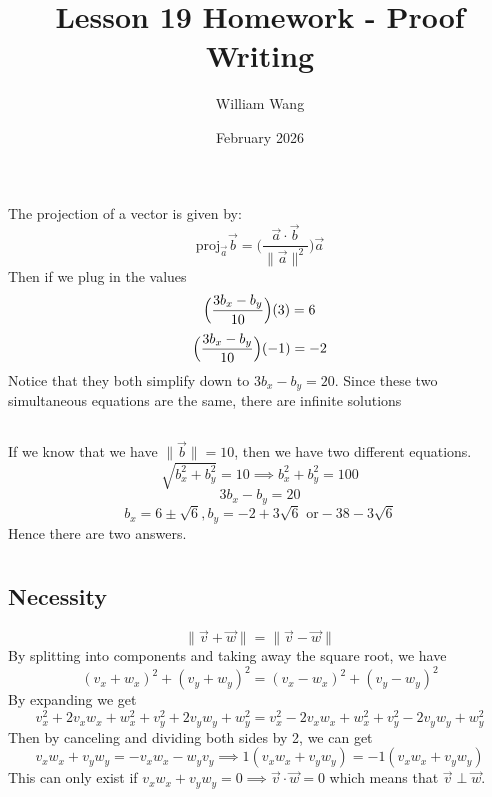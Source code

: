 \documentclass{article}
\title{Lesson 19 Homework - Proof Writing}
\author{William Wang}
\date{February 2026}
\begin{document}
\maketitle

\section{}
\subsection{}
The projection of a vector is given by:
\[\text{proj}_{\vec{a}} \vec{b} = \biggl ( \frac{\vec{a}\cdot\vec{b}}{\| \vec{a}\|^2}\biggl)\vec{a} \]
Then if we plug in the values 
\[\Bigl(\frac{3b_x - b_y}{10}\Bigl)(3) = 6\]
\[\Bigl(\frac{3b_x - b_y}{10}\Bigl)(-1) = -2\]
Notice that they both simplify down to \(3b_x - b_y = 20\). Since these two simultaneous equations are the same, there are infinite solutions
\subsection{}
If we know that we have \(\|\vec{b}\| = 10\), then we have two different equations. 
\[\sqrt{b_x^2 + b_y^2}  = 10 \implies  b_x^2 + b_y^2 = 100\]
\[3b_x - b_y = 20\]
\[b_x = 6 \pm \sqrt{6}, b_y = -2 + 3\sqrt{6} \text{ or} -38 -3\sqrt{6}\]
Hence there are two answers. 
\section{}
\subsection{Necessity}
\[\|\vec{v} + \vec{w}\| = \|\vec{v} - \vec{w}\|\]
By splitting into components and taking away the square root, we have
\[(v_x + w_x)^2 + (v_y + w_y)^2 = (v_x-w_x)^2 + (v_y-w_y)^2\]
By expanding we get
\[ v_x^2 + 2v_x w_x + w_x^2 + v_y^2+2v_y w_y + w_y^2 = v_x^2 - 2v_xw_x+w_x^2 + v_y^2-2v_yw_y+w_y^2\]
Then by canceling and dividing both sides by 2, we can get 
\[v_xw_x+v_yw_y = -v_xw_x-w_yv_y \implies 1(v_xw_x+v_yw_y) = -1(v_xw_x+v_yw_y)\]
This can only exist if \(v_xw_x+v_yw_y = 0 \implies \vec{v} \cdot \vec{w} = 0\) which means that \(\vec{v} \perp \vec{w}\). 
\end{document}
